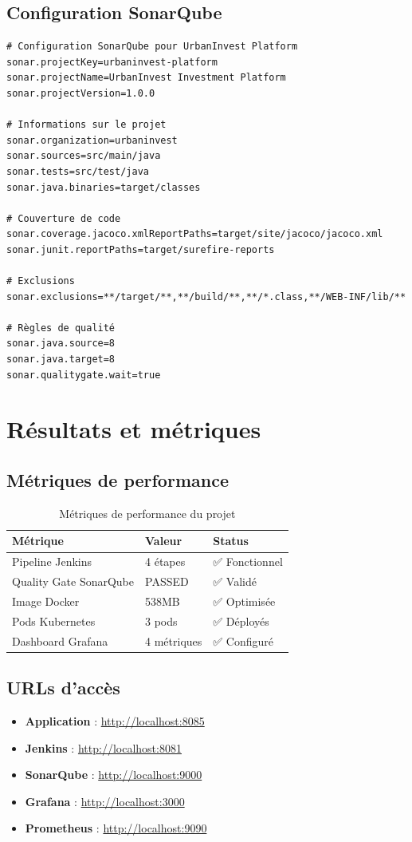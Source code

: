 \documentclass[12pt,a4paper]{article}
\begin{document}
\subsection{Configuration SonarQube}
\begin{lstlisting}[language=properties, caption=Configuration sonar-project.properties]
# Configuration SonarQube pour UrbanInvest Platform
sonar.projectKey=urbaninvest-platform
sonar.projectName=UrbanInvest Investment Platform
sonar.projectVersion=1.0.0

# Informations sur le projet
sonar.organization=urbaninvest
sonar.sources=src/main/java
sonar.tests=src/test/java
sonar.java.binaries=target/classes

# Couverture de code
sonar.coverage.jacoco.xmlReportPaths=target/site/jacoco/jacoco.xml
sonar.junit.reportPaths=target/surefire-reports

# Exclusions
sonar.exclusions=**/target/**,**/build/**,**/*.class,**/WEB-INF/lib/**

# Règles de qualité
sonar.java.source=8
sonar.java.target=8
sonar.qualitygate.wait=true
\end{lstlisting}

\section{Résultats et métriques}

\subsection{Métriques de performance}
\begin{table}[H]
\centering
\begin{tabular}{|l|l|l|}
\hline
\textbf{Métrique} & \textbf{Valeur} & \textbf{Status} \\
\hline
Pipeline Jenkins & 4 étapes & ✅ Fonctionnel \\
Quality Gate SonarQube & PASSED & ✅ Validé \\
Image Docker & 538MB & ✅ Optimisée \\
Pods Kubernetes & 3 pods & ✅ Déployés \\
Dashboard Grafana & 4 métriques & ✅ Configuré \\
\hline
\end{tabular}
\caption{Métriques de performance du projet}
\end{table}

\subsection{URLs d'accès}
\begin{itemize}
    \item \textbf{Application} : \url{http://localhost:8085}
    \item \textbf{Jenkins} : \url{http://localhost:8081}
    \item \textbf{SonarQube} : \url{http://localhost:9000}
    \item \textbf{Grafana} : \url{http://localhost:3000}
    \item \textbf{Prometheus} : \url{http://localhost:9090}
\end{itemize}
\end{document}
